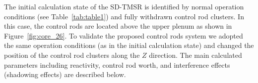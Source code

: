 %
%
%
%
%
%

The initial calculation state of the SD-TMSR is identified by normal operation 
conditions (see Table~\ref{tab:table1}) and fully withdrawn control rod 
clusters. In this case, the control rods are located above the upper plenum as 
shown in Figure~\ref{fig:core_26}. To validate the proposed control rods 
system we adopted the same operation conditions (as in the initial calculation 
state) and changed the position of the control rod clusters along the $Z$ 
direction. The main calculated parameters including reactivity, control rod 
worth, and interference effects (shadowing effects) are described below.

